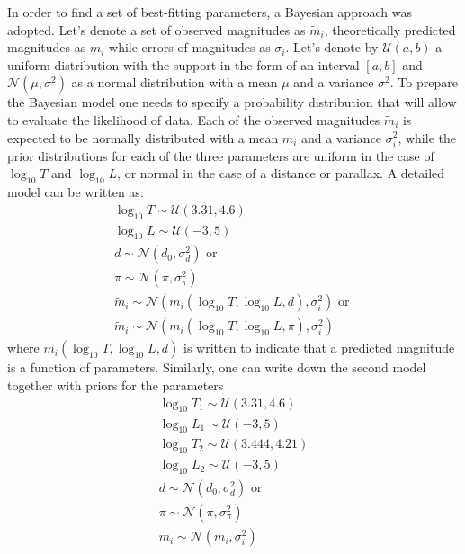\documentclass{pracalicmgr}
\begin{document}
In order to find a set of best-fitting parameters, a Bayesian approach was adopted. Let's denote a set of observed magnitudes as $\tilde{m}_i$, theoretically predicted
magnitudes as $m_i$ while errors of magnitudes as $\sigma_i$. Let's denote by $\mathcal{U}(a,b)$ a uniform distribution with the support in the form of an interval $[a,b]$ and $\mathcal{N}(\mu,\sigma^2)$ as a
normal distribution with a mean $\mu$ and a variance $\sigma^2$. To prepare the Bayesian model one needs to specify a probability distribution that will allow to evaluate the likelihood of
data. Each of the observed magnitudes $\tilde{m}_i$ is expected to be normally distributed with a mean $m_i$ and a variance $\sigma_i^2$, while the prior distributions for each of the three parameters
are uniform in the case of $\log_{10} T$ and $\log_{10} L$, or normal in the case of a distance or parallax. A detailed model can be written as:
\begin{equation}
    \begin{split}
    \log_{10}{T}\sim \mathcal{U}(3.31,4.6)\\
    \log_{10}{L} \sim \mathcal{U}(-3,5)\\
    d \sim \mathcal{N}(d_0,\sigma_d^2) \textrm{ or } \\
    \pi \sim \mathcal{N} (\pi,\sigma_{\pi}^2)\\
    \tilde{m}_i\sim \mathcal{N}(m_i(\log_{10} T, \log_{10} L, d ),\sigma_i^2) \textrm{ or }\\
    \tilde{m}_i\sim \mathcal{N}(m_i(\log_{10} T, \log_{10} L, \pi ),\sigma_i^2)
    \end{split}
\end{equation}
where $m_i(\log_{10} T, \log_{10} L, d )$ is written to indicate that a predicted magnitude is a function of parameters. 
Similarly, one can write down the second model together with priors for the parameters
\begin{equation}
    \begin{split}
    \log_{10}{T_1}\sim \mathcal{U}(3.31,4.6)\\
    \log_{10}{L_1} \sim \mathcal{U}(-3,5)\\
    \log_{10}{T_2}\sim \mathcal{U}(3.444,4.21)\\
    \log_{10}{L_2} \sim \mathcal{U}(-3,5)\\
    d \sim \mathcal{N}(d_0,\sigma_d^2) \textrm{ or } \\
    \pi \sim \mathcal{N} (\pi,\sigma_{\pi}^2)\\
    \tilde{m}_i\sim \mathcal{N}(m_i,\sigma_i^2)
    \end{split}
\end{equation}
\end{document}
